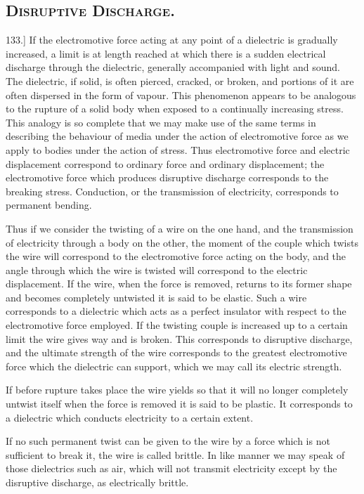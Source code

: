 \documentclass[12pt,oneside]{book}[2021/10/04]
\newcommand{\Heading}{\centering\normalfont}
\newcommand{\Section}[1]{\subsection*{\normalsize\Heading\scshape #1}}
\newcommand{\Runhead}[1]{\fancyhead[C]{\iffloatpage{}{\small#1}}}
\newcommand{\article}[1]{\phantomsection \label{art:#1}{#1.]}}
\newcommand{\¬}{\hphantom{0}}
\begin{document}
\Section{Disruptive Discharge.}
\Runhead{DISRUPTIVE DISCHARGE.}

\article{133} If the electromotive force acting at any point of a dielectric
is gradually increased, a limit is at length reached at which there
is a sudden electrical discharge through the dielectric, generally
accompanied with light and sound. The dielectric, if solid, is often
pierced, cracked, or broken, and portions of it are often dispersed in
the form of vapour. This phenomenon appears to be analogous
to the rupture of a solid body when exposed to a continually
increasing stress. This analogy is so complete that we may make
use of the same terms in describing the behaviour of media under
the action of electromotive force as we apply to bodies under the
action of stress. Thus electromotive force and electric displacement
correspond to ordinary force and ordinary displacement; the electromotive
force which produces disruptive discharge corresponds to
the breaking stress. Conduction, or the transmission of electricity,
corresponds to permanent bending.

Thus if we consider the twisting of a wire on the one hand, and
the transmission of electricity through a body on the other, the
moment of the couple which twists the wire will correspond to
the electromotive force acting on the body, and the angle through
which the wire is twisted will correspond to the electric displacement.
If the wire, when the force is removed, returns to its
former shape and becomes completely untwisted it is said to be
elastic. Such a wire corresponds to a dielectric which acts as a
perfect insulator with respect to the electromotive force employed.
If the twisting couple is increased up to a certain limit the wire
gives way and is broken. This corresponds to disruptive discharge,
and the ultimate strength of the wire corresponds to the greatest
electromotive force which the dielectric can support, which we may
call its electric strength.

If before rupture takes place the wire yields so that it will no
longer completely untwist itself when the force is removed it is
said to be plastic. It corresponds to a dielectric which conducts
electricity to a certain extent.

If no such permanent twist can be given to the wire by a force
which is not sufficient to break it, the wire is called brittle. In
like manner we may speak of those dielectrics such as air, which
will not transmit electricity except by the disruptive discharge, as
electrically brittle.
\end{document}
